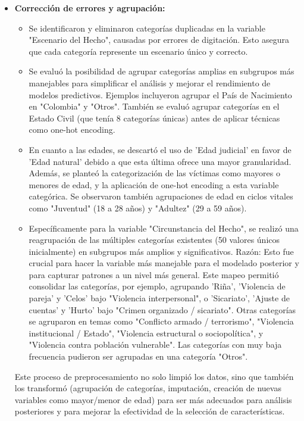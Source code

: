 \documentclass[lettersize,journal]{IEEEtran}
\begin{document}
\begin{itemize}
\begin{itemize}
    \end{itemize}
    \item \textbf{Corrección de errores y agrupación:}
    \begin{itemize}
        \item Se identificaron y eliminaron categorías duplicadas en la variable "Escenario del Hecho", causadas por errores de digitación. Esto asegura que cada categoría represente un escenario único y correcto.
        \item Se evaluó la posibilidad de agrupar categorías amplias en subgrupos más manejables para simplificar el análisis y mejorar el rendimiento de modelos predictivos. Ejemplos incluyeron agrupar el País de Nacimiento en "Colombia" y "Otros". También se evaluó agrupar categorías en el Estado Civil (que tenía 8 categorías únicas) antes de aplicar técnicas como one-hot encoding.
        \item En cuanto a las edades, se descartó el uso de 'Edad judicial' en favor de 'Edad natural' debido a que esta última ofrece una mayor granularidad. Además, se planteó la categorización de las víctimas como mayores o menores de edad, y la aplicación de one-hot encoding a esta variable categórica. Se observaron también agrupaciones de edad en ciclos vitales como "Juventud" (18 a 28 años) y "Adultez" (29 a 59 años).
        \item Específicamente para la variable "Circunstancia del Hecho", se realizó una reagrupación de las múltiples categorías existentes (50 valores únicos inicialmente) en subgrupos más amplios y significativos. Razón: Esto fue crucial para hacer la variable más manejable para el modelado posterior y para capturar patrones a un nivel más general. Este mapeo permitió consolidar las categorías, por ejemplo, agrupando 'Riña', 'Violencia de pareja' y 'Celos' bajo "Violencia interpersonal", o 'Sicariato', 'Ajuste de cuentas' y 'Hurto' bajo "Crimen organizado / sicariato". Otras categorías se agruparon en temas como "Conflicto armado / terrorismo", "Violencia institucional / Estado", "Violencia estructural o sociopolítica", y "Violencia contra población vulnerable". Las categorías con muy baja frecuencia pudieron ser agrupadas en una categoría "Otros".
    \end{itemize}
    Este proceso de preprocesamiento no solo limpió los datos, sino que también los transformó (agrupación de categorías, imputación, creación de nuevas variables como mayor/menor de edad) para ser más adecuados para análisis posteriores y para mejorar la efectividad de la selección de características.
\end{itemize}
\end{document}
